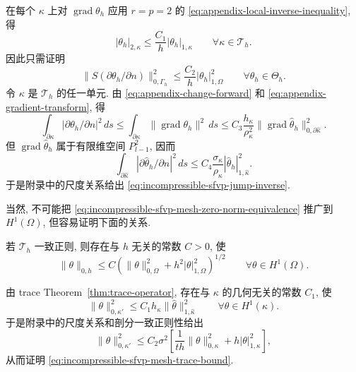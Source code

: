 \begin{Proof}
在每个 $\kappa$ 上对 $\operatorname{grad}\theta_h$
应用 $r=p=2$ 的 \eqref{eq:appendix-local-inverse-inequality}, 得
\[
|\theta_h|_{2,\kappa}
\leq\frac{C_1}{h}|\theta_h|_{1,\kappa}
\qquad\forall\kappa\in\mathcal T_h.
\]
因此只需证明
\begin{equation}\label{eq:incompressible-sfvp-jump-inverse}
\|S(\partial\theta_h/\partial n)\|_{0,\Gamma_h}^2
\leq\frac{C_2}{h}|\theta_h|_{1,\Omega}^2
\qquad\forall\theta_h\in\Theta_h.
\end{equation}
令 $\kappa$ 是 $\mathcal T_h$ 的任一单元.
由 \eqref{eq:appendix-change-forward}
和 \eqref{eq:appendix-gradient-transform}, 得
\[
\int_{\partial\kappa}|\partial\theta_h/\partial n|^2\,ds
\leq\int_{\partial\kappa}\|\operatorname{grad}\theta_h\|^2\,ds
\leq C_3\frac{h_\kappa}{\rho_\kappa^2}
\|\operatorname{grad}\widehat\theta_h\|_{0,\partial\widehat\kappa}^2.
\]
但 $\operatorname{grad}\widehat\theta_h$ 属于有限维空间
$P_{l-1}^2$, 因而
\[
\int_{\partial\widehat\kappa}
|\partial\widehat\theta_h/\partial n|^2\,ds
\leq C_4\frac{\sigma_\kappa}{\rho_\kappa}
|\widehat\theta_h|_{1,\widehat\kappa}^2.
\]
于是附录中的尺度关系给出
\eqref{eq:incompressible-sfvp-jump-inverse}.
\end{Proof}

当然, 不可能把
\eqref{eq:incompressible-sfvp-mesh-zero-norm-equivalence}
推广到 $H^1(\Omega)$, 但容易证明下面的关系.

\begin{Lemma}\label{lem:incompressible-sfvp-mesh-trace-bound}
若 $\mathcal T_h$ 一致正则, 则存在与 $h$ 无关的常数 $C>0$, 使
\begin{equation}\label{eq:incompressible-sfvp-mesh-trace-bound}
\|\theta\|_{0,h}
\leq C\left(\|\theta\|_{0,\Omega}^2
+h^2|\theta|_{1,\Omega}^2\right)^{1/2}
\qquad\forall\theta\in H^1(\Omega).
\end{equation}
\end{Lemma}

\begin{Proof}
由 trace Theorem~\ref{thm:trace-operator},
存在与 $\kappa$ 的几何无关的常数 $C_1$, 使
\[
\|\theta\|_{0,\kappa'}^2
\leq C_1h_\kappa\|\widehat\theta\|_{1,\widehat\kappa}^2
\qquad\forall\theta\in H^1(\kappa).
\]
于是附录中的尺度关系和剖分一致正则性给出
\[
\|\theta\|_{0,\kappa'}^2
\leq C_2\sigma^2
\left[\frac1{th}\|\theta\|_{0,\kappa}^2
+h|\theta|_{1,\kappa}^2\right],
\]
从而证明 \eqref{eq:incompressible-sfvp-mesh-trace-bound}.
\end{Proof}

